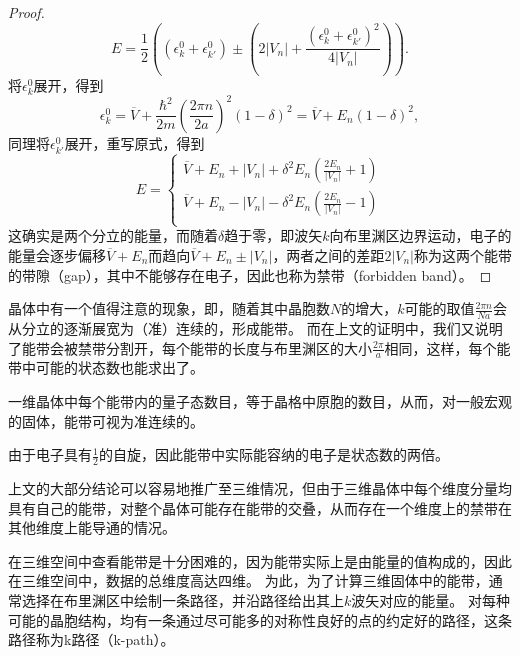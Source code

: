 \begin{proof}
    \begin{equation}
        E = \frac{1}{2} \left( (\epsilon_k^0 + \epsilon_{k'}^0) \pm \left( 2 |V_n| + \frac{(\epsilon_k^0 + \epsilon_{k'}^0)^2}{4|V_n|} \right) \right).
    \end{equation}
    将$\epsilon_k^0$展开，得到
    \begin{equation}
        \epsilon_k^0 = \overline V + \frac{\hbar^2}{2m} \left(\frac{2\pi n}{2a}\right)^2 (1-\delta)^2 = \overline V + E_n (1 - \delta)^2,
    \end{equation}
    同理将$\epsilon_{k'}^0$展开，重写原式，得到
    \begin{equation}
        E = \left\{
            \begin{aligned}
                \overline V + E_n + | V_n | + \delta^2 E_n \left( \frac{2 E_n}{|V_n|} + 1\right) \\
                \overline V + E_n - | V_n | - \delta^2 E_n \left( \frac{2 E_n}{|V_n|} - 1\right) \\
            \end{aligned}
        \right.
    \end{equation}
    这确实是两个分立的能量，而随着$\delta$趋于零，即波矢$k$向布里渊区边界运动，电子的能量会逐步偏移$\overline V + E_n$而趋向$\overline V + E_n \pm |V_n|$，两者之间的差距$2 |V_n|$称为这两个能带的带隙（gap），其中不能够存在电子，因此也称为禁带（forbidden band）。
\end{proof}

晶体中有一个值得注意的现象，即，随着其中晶胞数$N$的增大，$k$可能的取值$\frac{2\pi n}{Na}$会从分立的逐渐展宽为（准）连续的，形成能带。
而在上文的证明中，我们又说明了能带会被禁带分割开，每个能带的长度与布里渊区的大小$\frac{2 \pi}{a}$相同，这样，每个能带中可能的状态数也能求出了。

\begin{corollary}
    一维晶体中每个能带内的量子态数目，等于晶格中原胞的数目，从而，对一般宏观的固体，能带可视为准连续的。
\end{corollary}

由于电子具有$\frac{1}{2}$的自旋，因此能带中实际能容纳的电子是状态数的两倍。

上文的大部分结论可以容易地推广至三维情况，但由于三维晶体中每个维度分量均具有自己的能带，对整个晶体可能存在能带的交叠，从而存在一个维度上的禁带在其他维度上能导通的情况。

在三维空间中查看能带是十分困难的，因为能带实际上是由能量的值构成的，因此在三维空间中，数据的总维度高达四维。
为此，为了计算三维固体中的能带，通常选择在布里渊区中绘制一条路径，并沿路径给出其上$k$波矢对应的能量。
对每种可能的晶胞结构，均有一条通过尽可能多的对称性良好的点的约定好的路径，这条路径称为k路径（k-path）。

